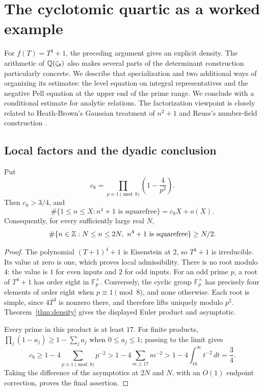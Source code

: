 \section{The cyclotomic quartic as a worked example}
\label{sec:cyclotomic}

For $f(T)=T^4+1$, the preceding argument gives an explicit density.
The arithmetic of $\mathbb Q(\zeta_8)$ also makes several parts of the
determinant construction particularly concrete. We describe that
specialization and two additional ways of organizing its estimates:
the level equation on integral representatives and the negative Pell
equation at the upper end of the prime range.
We conclude with a conditional estimate for analytic relations.
The factorization viewpoint is closely related to Heath-Brown's
Gaussian treatment of $n^2+1$ and Reuss's number-field construction
\cite{HeathBrown2012Squarefree,Reuss2015PowerFree}.

\subsection{Local factors and the dyadic conclusion}

\begin{corollary}\label{cor:cyclotomic-density}
Put
\[
 c_8=\prod_{p\equiv1\pmod8}\left(1-\frac4{p^2}\right).
\]
Then $c_8>3/4$, and
\[
 \#\{1\le n\le X:n^4+1\text{ is squarefree}\}=c_8X+o(X).
\]
Consequently, for every sufficiently large real $N$,
\[
 \#\{n\in\mathbb Z:N\le n\le2N,\ n^4+1\text{ is squarefree}\}
 \ge N/2.
\]
\end{corollary}

\begin{proof}
The polynomial $(T+1)^4+1$ is Eisenstein at $2$, so $T^4+1$ is
irreducible. Its value at zero is one, which proves local
admissibility. There is no root modulo $4$: the value is $1$ for
even inputs and $2$ for odd inputs. For an odd prime $p$, a root of
$T^4+1$ has order eight in $\mathbb F_p^\times$. Conversely, the cyclic
group $\mathbb F_p^\times$ has precisely four elements of order eight
when $p\equiv1\pmod8$, and none otherwise. Each root is simple, since
$4T^3$ is nonzero there, and therefore lifts uniquely modulo $p^2$.
Theorem~\ref{thm:density} gives the displayed Euler product and asymptotic.

Every prime in this product is at least $17$. For finite products,
$\prod_j(1-a_j)\ge1-\sum_j a_j$ when $0\le a_j\le1$; passing to
the limit gives
\[
 c_8\ge1-4\sum_{p\equiv1\pmod8}p^{-2}
 >1-4\sum_{m\ge17}m^{-2}
 >1-4\int_{16}^{\infty}t^{-2}\,dt=\frac34.
\]
Taking the difference of the asymptotics at $2N$ and $N$, with an
$O(1)$ endpoint correction, proves the final assertion.
\end{proof}

